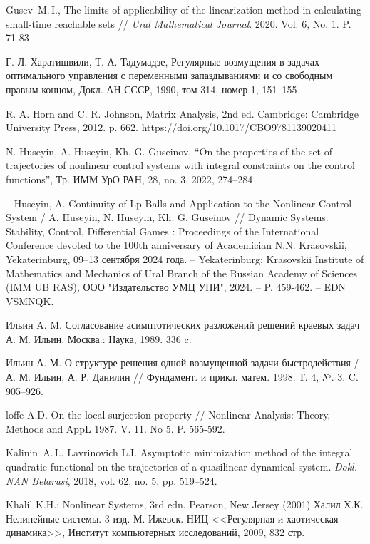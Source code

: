 \documentclass[../main.tex]{subfiles}
\begin{document}
\begin{thebibliography}{99}
Gusev~M.\,I., The limits of applicability of the linearization method in calculating small-time reachable sets // \emph{Ural Mathematical Journal}. 2020. Vol. 6, No. 1. P. 71-83

Г. Л. Харатишвили, Т. А. Тадумадзе, Регулярные возмущения в задачах оптимального управления с переменными запаздываниями и со свободным правым концом, Докл. АН СССР, 1990, том 314, номер 1, 151–155

R. A. Horn and C. R. Johnson, Matrix Analysis, 2nd ed. Cambridge: Cambridge University Press, 2012. p. 662. https://doi.org/10.1017/CBO9781139020411

N. Huseyin, A. Huseyin, Kh. G. Guseinov, “On the properties of the set of trajectories of nonlinear control systems with integral constraints on the control functions”, Тр. ИММ УрО РАН, 28, no. 3, 2022, 274–284

 
Huseyin, A. Continuity of Lp Balls and Application to the Nonlinear Control System / A. Huseyin, N. Huseyin, Kh. G. Guseinov // Dynamic Systems: Stability, Control, Differential Games : Proceedings of the International Conference devoted to the 100th anniversary of Academician N.N. Krasovskii, Yekaterinburg, 09–13 сентября 2024 года. – Yekaterinburg: Krasovskii Institute of Mathematics and Mechanics of Ural Branch of the Russian Academy of Sciences (IMM UB RAS), ООО "Издательство УМЦ УПИ", 2024. – P. 459-462. – EDN VSMNQK.


Ильин A. M. Согласование асимптотических разложений решений краевых задач А. М. Ильин.  Москва.: Наука, 1989.  336 c.

Ильин А. М. О структуре решения одной возмущенной задачи быстродействия /А. М. Ильин, А. Р. Данилин // Фундамент. и прикл. матем. 1998. Т. 4, №. 3. C. 905–926.

loffe A.D. On the local surjection property // Nonlinear Analysis: Theory, Methods and AppL 1987. V. 11. No 5. P. 565-592.


Kalinin~A.\,I., Lavrinovich L.I. Asymptotic minimization method of the integral quadratic functional on
the trajectories of a quasilinear dynamical system. \emph{Dokl. NAN Belarusi}, 2018, vol. 62, no. 5, pp. 519–524.

Khalil K.H.: Nonlinear Systems, 3rd edn. Pearson, New Jersey (2001)
Халил Х.К. Нелинейные системы. 3 изд. М.-Ижевск. НИЦ <<Регулярная и хаотическая динамика>>, Институт компьютерных исследований, 2009, 832 стр.


\end{thebibliography}
\end{document}
